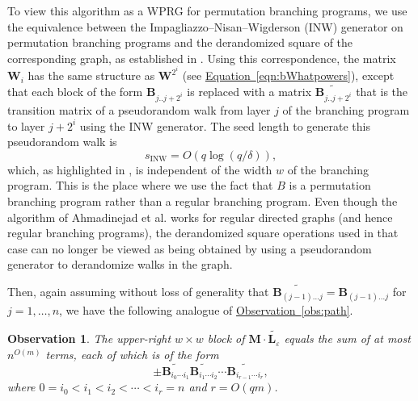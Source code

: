 \documentclass[11pt]{article}
\numberwithin{equation}{section}
\theoremstyle{definition}
\theoremstyle{plain}
\newcommand{\expref}[2]{\hyperref[#2]{#1~\ref{#2}}}
\newcommand{\expeqref}[2]{\hyperref[#2]{#1~\eqref{#2}}}
\newtheorem{observation}[theorem]{Observation}
\newcommand{\eps}{\varepsilon}
\newcommand{\mB}{\mathbf{B}}
\newcommand{\mM}{\mathbf{M}}
\newcommand{\mW}{\mathbf{W}}
\newcommand{\Lte}{\widetilde{\mathbf{L}_{\eps}}}
\newcommand{\sINW}{s_{\mathrm{INW}}}
\begin{document}
    To view this algorithm as a WPRG for permutation branching programs, we use
    the equivalence between the Impagliazzo--Nisan--Wigderson (INW) generator on permutation branching programs and the derandomized square of the corresponding graph, as established in \cite{RozenmanVa05,HozaPyVa21}.
    Using this correspondence, the matrix $\mW_i$ has the same structure as $\mW^{2^i}$ (see \expeqref{Equation}{eqn:bWhatpowers}), except that each block of the form $\mB_{j..j+2^i}$ is replaced with a matrix $\widetilde{\mB_{j..j+2^i}}$ that is the transition matrix of a pseudorandom
    walk from layer $j$ of the branching program to layer $j+2^i$ using the INW generator.  
    The seed length to generate this pseudorandom walk is
    $$\sINW = O(q\log(q/\delta)),$$
    which, as highlighted in \cite{HozaPyVa21}, is independent of the width $w$ of the branching program.
    This is the place where we use the fact that $B$ is a permutation branching program rather than a regular branching program.  Even though the algorithm of Ahmadinejad et al. works for regular directed graphs (and hence regular branching programs), the derandomized square operations used in that case can no longer be viewed as being obtained by using a pseudorandom generator to derandomize walks in the graph.
    
    Then, again assuming without loss of generality that 
    $\widetilde{\mB_{(j-1)\ldots j}}=\mB_{(j-1)\ldots j}$ for $j=1,\ldots,n$, we have
    the following analogue of \expref{Observation}{obs:path}. %
    \begin{observation} \label{obs:cycle}
    The upper-right $w\times w$ block of $\mM \cdot \Lte$ equals the sum of at most $n^{O(m)}$ terms, each of which is of the form 
    \begin{equation} \label{eqn:permutation-terms}
    \pm \widetilde{\mB_{i_0\cdots i_1}}
    \widetilde{\mB_{i_1\cdots i_2}}
    \cdots
    \widetilde{\mB_{i_{r-1}\cdots i_r}},
    \end{equation}
    where $0=i_0<i_1<i_2<\cdots<i_r=n$ and $r=O(qm)$.
    \end{observation}
    
\end{document}
